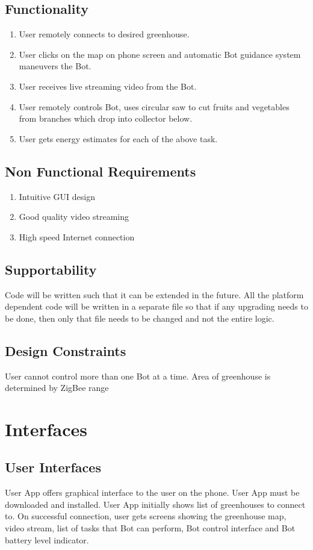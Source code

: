 \documentclass[a4paper, 12pt]{article}
\begin{document}
\subsection{Functionality}
\begin{enumerate}
 \item User remotely connects to desired greenhouse.
 \item User clicks on the map on phone screen and automatic Bot guidance system maneuvers the Bot.
 \item User receives live streaming video from the Bot.
 \item User remotely controls Bot, uses circular saw to cut fruits and vegetables from branches 
 which drop into collector below.
 \item User gets energy estimates for each of the above task.
\end{enumerate}

\subsection{Non Functional Requirements}
\begin{enumerate}
 \item Intuitive GUI design
 \item Good quality video streaming
 \item High speed Internet connection
\end{enumerate}


\subsection{Supportability}
Code will be written such that it can be extended in the future.
All the platform dependent code will be written in a separate file so that if any upgrading needs to be done, 
then only that file needs to be changed and not the entire logic.


\subsection{Design Constraints}
User cannot control more than one Bot at a time. Area of greenhouse is determined by ZigBee range

\section{Interfaces}
\subsection{User Interfaces}
User App offers graphical interface to the user on the phone. User App must be downloaded and installed.
User App initially shows list of greenhouses to connect to. On successful connection, user gets screens showing
the greenhouse map, video stream, list of tasks that Bot can perform, Bot control interface and Bot battery level
indicator.
\end{document}
